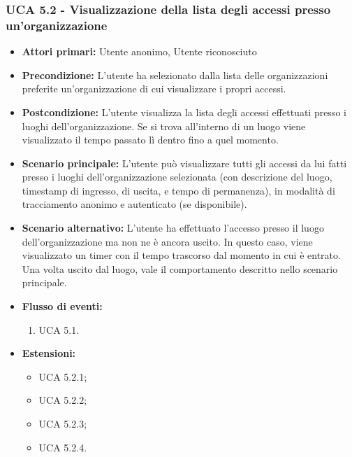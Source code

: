 \subsubsection{UCA 5.2 - Visualizzazione della lista degli accessi presso un'organizzazione}
\begin{itemize}
    \item \textbf{Attori primari:} Utente anonimo, Utente riconosciuto
    \item \textbf{Precondizione:} L'utente ha selezionato dalla lista delle organizzazioni preferite un'organizzazione di cui visualizzare i propri accessi.
    \item \textbf{Postcondizione:} L'utente visualizza la lista degli accessi effettuati presso i luoghi dell'organizzazione. Se si trova all'interno di un luogo viene visualizzato il tempo passato lì dentro fino a quel momento.
    \item \textbf{Scenario principale:} L'utente può visualizzare tutti gli accessi da lui fatti presso i luoghi dell'organizzazione selezionata (con descrizione del luogo, timestamp di ingresso, di uscita, e tempo di permanenza), in modalità di tracciamento anonimo e autenticato (se disponibile).
    \item \textbf{Scenario alternativo:} L'utente ha effettuato l'accesso presso il luogo dell'organizzazione ma non ne è ancora uscito. In questo caso, viene visualizzato un timer con il tempo trascorso dal momento in cui è entrato.
    Una volta uscito dal luogo, vale il comportamento descritto nello scenario principale.
    \item \textbf{Flusso di eventi:}
    \begin{enumerate}
        \item UCA 5.1.
    \end{enumerate}
    \item \textbf{Estensioni:}
    \begin{itemize}
        \item UCA 5.2.1;
        \item UCA 5.2.2;
        \item UCA 5.2.3;
        \item UCA 5.2.4.
    \end{itemize}
\end{itemize}


